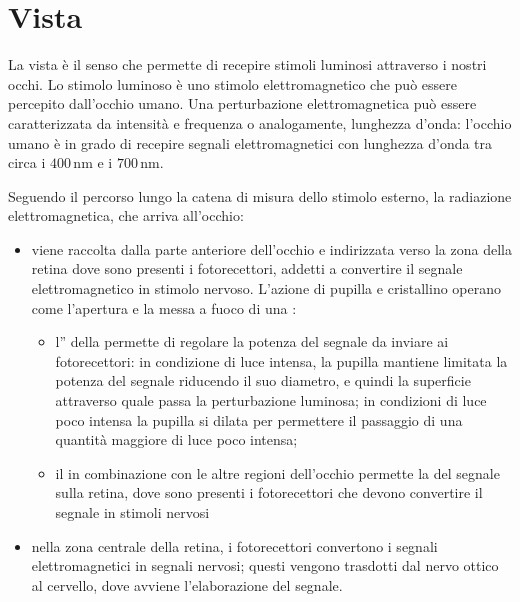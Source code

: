 \documentclass[letterpaper,10pt,italian]{jupyterBook}
\begin{document}
\sphinxAtStartPar
{} 

\sphinxstepscope


\section{Vista}
\label{\detokenize{ch/intro/sensing-sight:vista}}\label{\detokenize{ch/intro/sensing-sight:physics-hs-intro-sensing-sight}}\label{\detokenize{ch/intro/sensing-sight::doc}}
\sphinxAtStartPar
La vista è il senso che permette di recepire stimoli luminosi attraverso i nostri occhi. Lo stimolo luminoso è uno stimolo elettromagnetico che può essere percepito dall’occhio umano. Una perturbazione elettromagnetica può essere caratterizzata da intensità e frequenza \sphinxhyphen{} o analogamente, lunghezza d’onda: l’occhio umano è in grado di recepire segnali elettromagnetici con lunghezza d’onda tra circa i \(400 \, \text{nm}\) e i \(700 \, \text{nm}\).

\sphinxAtStartPar
Seguendo il percorso lungo la catena di misura dello stimolo esterno, la radiazione elettromagnetica, che arriva all’occhio:
\begin{itemize}
\item {} 
\sphinxAtStartPar
viene raccolta dalla parte anteriore dell’occhio e indirizzata verso la zona della retina dove sono presenti i fotorecettori, addetti a convertire il segnale elettromagnetico in stimolo nervoso. L’azione di pupilla e cristallino operano come l’apertura e la messa a fuoco di una {\hyperref[\detokenize{ch/waves/optics-lens:physics-hs-waves-optics-geometric-lenses}]{}}:
\begin{itemize}
\item {} 
\sphinxAtStartPar
l” della  permette di regolare la potenza del segnale da inviare ai fotorecettori: in condizione di luce intensa, la pupilla mantiene limitata la potenza del segnale riducendo il suo diametro, e quindi la superficie attraverso quale passa la perturbazione luminosa; in condizioni di luce poco intensa la pupilla si dilata per permettere il passaggio di una quantità maggiore di luce poco intensa;

\item {} 
\sphinxAtStartPar
il  \sphinxhyphen{} in combinazione con le altre regioni dell’occhio \sphinxhyphen{} permette la  del segnale sulla retina, dove sono presenti i fotorecettori che devono convertire il segnale in stimoli nervosi

\end{itemize}

\item {} 
\sphinxAtStartPar
nella zona centrale della retina, i fotorecettori convertono i segnali elettromagnetici in segnali nervosi; questi vengono trasdotti dal nervo ottico al cervello, dove avviene l’elaborazione del segnale.

\end{itemize}
\end{document}
